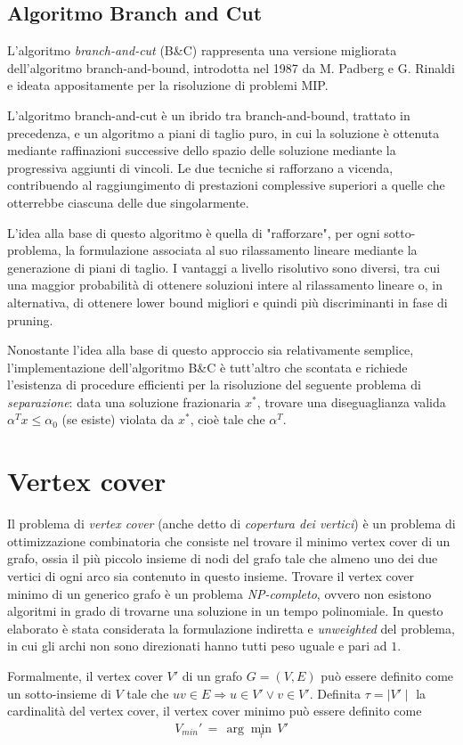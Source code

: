 \subsection{Algoritmo Branch and Cut}
L'algoritmo \textit{branch-and-cut} (B\&C) rappresenta una versione migliorata dell'algoritmo branch-and-bound, introdotta nel 1987
da M. Padberg e G. Rinaldi \cite{PADBERG19871} e ideata appositamente per la risoluzione di problemi MIP. 

L'algoritmo branch-and-cut è un ibrido tra branch-and-bound, trattato in precedenza, e un algoritmo
a piani di taglio puro, in cui la soluzione è ottenuta mediante raffinazioni successive dello spazio delle soluzione mediante la
progressiva aggiunti di vincoli.
Le due tecniche si rafforzano a vicenda, contribuendo al raggiungimento di prestazioni complessive superiori a quelle
che otterrebbe ciascuna delle due singolarmente.

L'idea alla base di questo algoritmo è quella di "rafforzare", per ogni sotto-problema, la formulazione associata al suo rilassamento
lineare mediante la generazione di piani di taglio. I vantaggi a livello risolutivo sono diversi, tra cui una maggior probabilità di
ottenere soluzioni intere al rilassamento lineare o, in alternativa, di ottenere lower bound migliori e quindi più discriminanti in 
fase di pruning. 

Nonostante l'idea alla base di questo approccio sia relativamente semplice, l'implementazione dell'algoritmo B\&C è tutt'altro che
scontata e richiede l'esistenza di procedure efficienti per la risoluzione del seguente problema di \textsl{separazione}: data una
soluzione frazionaria {$x^*$}, trovare una diseguaglianza valida $\alpha^Tx\leq \alpha_0$ (se esiste) violata da $x^*$, cioè
tale che $\alpha^T$.

\section{Vertex cover}
Il problema di \textit{vertex cover} (anche detto di \textsl{copertura dei vertici}) è un problema di ottimizzazione combinatoria 
che consiste nel trovare il minimo vertex cover di un grafo, ossia il più piccolo insieme di nodi del grafo tale che almeno uno dei due 
vertici di ogni arco sia contenuto in questo insieme. Trovare il vertex cover minimo di un generico grafo è un problema 
\textsl{NP-completo}, ovvero non esistono algoritmi in grado di trovarne una soluzione in un tempo polinomiale. In questo elaborato è
stata considerata la formulazione indiretta e \textit{unweighted} del problema, in cui gli archi non sono direzionati
hanno tutti peso uguale e pari ad $1$.

Formalmente, il vertex cover $V'$ di un grafo $G=(V,E)$ può essere definito come un sotto-insieme di $V$ tale che
$uv \in E \Rightarrow u \in V' \vee v \in V'$. Definita $\tau=\mid V' \mid$ la cardinalità del vertex cover, il vertex cover minimo può
essere definito come
\begin{align*}
V_{min}' \, = \, \arg\min_{\tau} \, V' 
\end{align*} 

